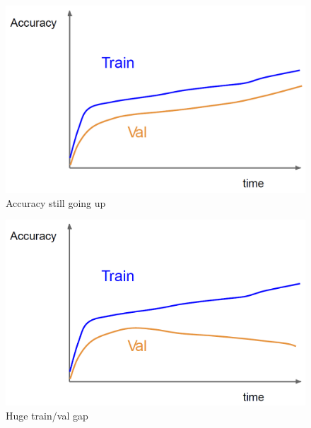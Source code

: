\begin{minipage}{.3\linewidth}
    \begin{figure}[H]
        \centering
        \includegraphics[width=0.9\linewidth]{images/tnn-acc-1}
        \caption[Accuracy still going up]{Accuracy still going up}
        \label{fig:tnn-acc-1}
    \end{figure}
\end{minipage}
\begin{minipage}{.3\linewidth}
    \begin{figure}[H]
        \centering
        \includegraphics[width=0.9\linewidth]{images/tnn-acc-2}
        \caption[Huge train/val gap]{Huge train/val gap}
        \label{fig:tnn-acc-2}
    \end{figure}
\end{minipage}
